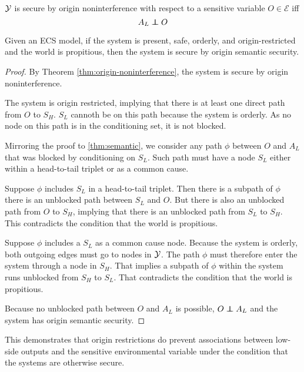 \documentclass[../thesis.tex]{subfiles}
\begin{document}
\begin{dfn}
  $\mathcal{Y}$ is secure by origin noninterference with respect
  to a sensitive variable $O \in \mathcal{E}$ iff
  $$A_L \independent O$$
\end{dfn}

\begin{thm}
  Given an ECS model,
  if the system is present, safe, orderly,
  and origin-restricted
  and the world is propitious,
  then the system
  is secure by origin semantic security.
\end{thm}

\begin{proof}
  By Theorem \ref{thm:origin-noninterference},
  the system is secure by origin noninterference.

  The system is origin restricted, implying that
  there is at least one direct path from $O$ to $S_H$.
  $S_L$ cannoth be on this path because the system
  is orderly.
  As no node on this path is in the conditioning
  set, it is not blocked.
  
  Mirroring the proof to \ref{thm:semantic},
  we consider any path $\phi$ between $O$ and $A_L$
  that was blocked by conditioning on $S_L$.
  Such path must have a node $S_L$ either within
  a head-to-tail triplet or as a common cause.

  Suppose $\phi$ includes $S_L$ in a head-to-tail
  triplet.
  Then there is a subpath of $\phi$ there is an
  unblocked path between $S_L$ and $O$.
  But there is also an unblocked path from $O$
  to $S_H$, implying that there is an unblocked
  path from $S_L$ to $S_H$.
  This contradicts the condition that the world is
  propitious.

  Suppose $\phi$ includes a $S_L$ as a common cause
  node.
  Because the system is orderly, both outgoing
  edges must go to nodes in $\mathcal{Y}$.
  The path $\phi$ must therefore enter the system
  through a node in $S_H$.
  That implies a subpath of $\phi$ within the
  system runs unblocked from $S_H$ to $S_L$.
  That contradicts the condition that the world
  is propitious.

  Because no unblocked path between $O$ and $A_L$
  is possible, $O \independent A_L$ and the
  system has origin semantic security.
  
\end{proof}

This demonstrates that origin restrictions
do prevent associations between
low-side outputs and the sensitive environmental
variable under the condition that the systems
are otherwise secure.
\end{document}
